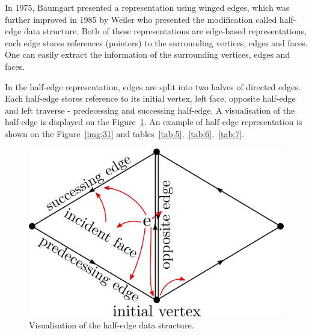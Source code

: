 In 1975, Baumgart \cite{baumgart1975polyhedron} presented a representation
using winged edges, which was further improved in 1985 by Weiler \cite{weiler1985edge}
who presented the modification called half-edge data structure.
Both of these representations are edge-based representations, each edge stores
references (pointers) to the surrounding vertices, edges and faces. One can easily extract the information of the
surrounding vertices, edges and faces.

In the half-edge representation, edges are split into two halves of directed edges.
Each half-edge
stores reference to its initial vertex, left face, opposite half-edge and left
traverse - predecessing and successing half-edge. A visualisation of the
half-edge is displayed on the Figure~\ref{img:32}. An example of half-edge
representation is shown on the Figure~\ref{img:31} and 
tables~\ref{tab:5},~\ref{tab:6},~\ref{tab:7}.

\begin{figure}
    \centerline{\includegraphics[scale=0.5]{images/img32}}
    \caption[Visualisation of the half-edge data structure]
    {Visualisation of the half-edge data structure.}
    \label{img:32}
\end{figure}

